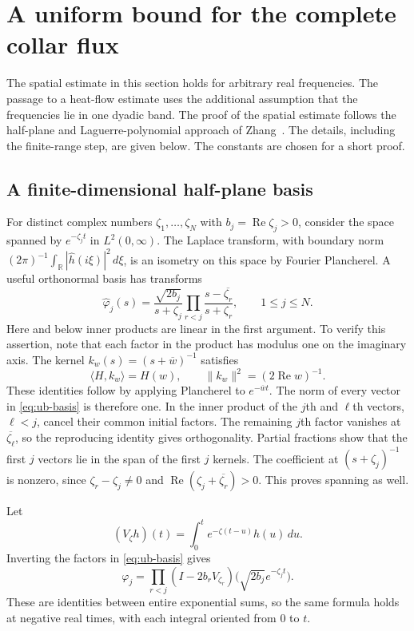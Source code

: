 \section{A uniform bound for the complete collar flux}
\label{sec:upper-bound}

The spatial estimate in this section holds for arbitrary real frequencies.
The passage to a heat-flow estimate uses the additional assumption that
the frequencies lie in one dyadic band.  The proof of the spatial estimate
follows the half-plane and Laguerre-polynomial approach of
Zhang~\cite{Zhang2026}.  The details, including the finite-range step, are
given below.  The constants are chosen for a short proof.

\subsection{A finite-dimensional half-plane basis}

For distinct complex numbers $\zeta_1,\ldots,\zeta_N$ with
$b_j=\operatorname{Re}\zeta_j>0$, consider the space spanned by
$e^{-\zeta_jt}$ in $L^2(0,\infty)$.  The Laplace transform, with boundary
norm $(2\pi)^{-1}\int_{\mathbb R}|\widehat h(i\xi)|^2\,d\xi$, is an
isometry on this space by Fourier Plancherel.  A useful orthonormal basis
has transforms
\begin{equation}\label{eq:ub-basis}
 \widehat\varphi_j(s)=\frac{\sqrt{2b_j}}{s+\zeta_j}
       \prod_{r<j}\frac{s-\overline{\zeta_r}}{s+\zeta_r},
 \qquad 1\le j\le N.
\end{equation}
Here and below inner products are linear in the first argument.
To verify this assertion, note that each factor in the product has
modulus one on the imaginary axis.  The kernel
$k_w(s)=(s+\overline w)^{-1}$ satisfies
\[
 \langle H,k_w\rangle=H(w),\qquad
 \|k_w\|^2=(2\operatorname{Re}w)^{-1}.
\]
These identities follow by applying Plancherel to
$e^{-\overline w t}$.  The norm of every vector in
\eqref{eq:ub-basis} is therefore one.  In the inner product of the $j$th
and $\ell$th vectors, $\ell<j$, cancel their common initial factors.
The remaining $j$th factor vanishes at $\overline{\zeta_\ell}$, so the
reproducing identity gives orthogonality.  Partial fractions show that
the first $j$ vectors lie in the span of the first $j$ kernels.  The
coefficient at $(s+\zeta_j)^{-1}$ is nonzero, since
$\zeta_r-\zeta_j\ne0$ and $\operatorname{Re}(\zeta_j+
\overline{\zeta_r})>0$.  This proves spanning as well.

Let
\[
 (V_\zeta h)(t)=\int_0^t e^{-\zeta(t-u)}h(u)\,du.
\]
Inverting the factors in \eqref{eq:ub-basis} gives
\begin{equation}\label{eq:ub-volterra}
 \varphi_j=
 \prod_{r<j}(I-2b_rV_{\zeta_r})
       \bigl(\sqrt{2b_j}e^{-\zeta_jt}\bigr).
\end{equation}
These are identities between entire exponential sums, so the same formula
holds at negative real times, with each integral oriented from $0$ to $t$.


